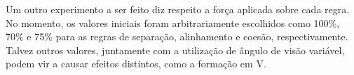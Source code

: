 \documentclass[12pt]{article}
\begin{document}
Um outro experimento a ser feito diz respeito a força
aplicada sobre cada regra. No momento, os valores iniciais foram
arbitrariamente escolhidos como 100\%,
70\% e 75\% para as regras de separação, alinhamento e coesão,
respectivamente. Talvez outros valores, juntamente com a utilização de
ângulo de visão variável, podem vir a causar efeitos distintos, como a
formação em V.




\end{document}
